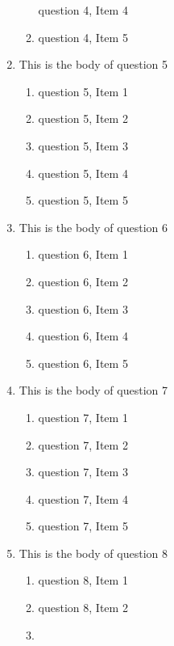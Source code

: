 \documentclass{article}
\begin{document}
\begin{enumerate}
\begin{enumerate}
    question 4, Item 4
    \item
    question 4, Item 5
    \end{enumerate}
\item
This is the body of question 5
    \begin{enumerate}
    \item
    question 5, Item 1
    \item
    question 5, Item 2
    \item
    question 5, Item 3
    \item
    question 5, Item 4
    \item
    question 5, Item 5
    \end{enumerate}
\item
This is the body of question 6
    \begin{enumerate}
    \item
    question 6, Item 1
    \item
    question 6, Item 2
    \item
    question 6, Item 3
    \item
    question 6, Item 4
    \item
    question 6, Item 5
    \end{enumerate}
\item
This is the body of question 7
    \begin{enumerate}
    \item
    question 7, Item 1
    \item
    question 7, Item 2
    \item
    question 7, Item 3
    \item
    question 7, Item 4
    \item
    question 7, Item 5
    \end{enumerate}
\item
This is the body of question 8
    \begin{enumerate}
    \item
    question 8, Item 1
    \item
    question 8, Item 2
    \item

\end{enumerate}
\end{enumerate}
\end{document}
